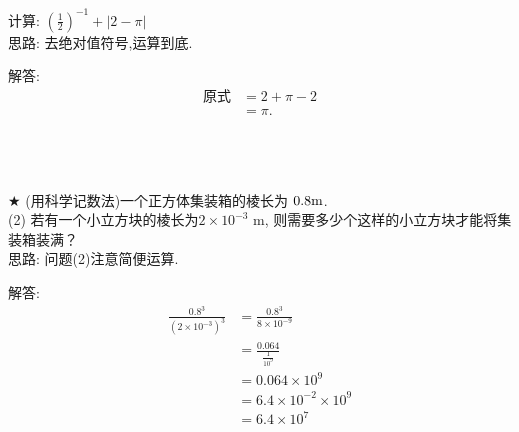 \begin{comment}
\item {
    (注意: 除号使用分数形式) 已知$10^{-m}=a, 10^{-n}=b$($m, n$是整数),求$10^{2m-3n}$的值(用含有$a, b$的代数式表示).
    \\ \\ \\
}
\end{comment}

\begin{comment}
\item {
    已知$2^x=3, 2^y=6, 2^z=12$,判断下列有关$x, y, z$的数量关系式的对错.\\
    (1) $x+z=2y$\\
    (2) $x+y+3=2z$\\
    (3) $4x=z$\\
    (4) $x+1=y$
    \\ \\
}
\end{comment}

\item {
    计算: $ (\frac{1}{2})^{-1} + \lvert 2-\pi \rvert $
    \ifshowSolution
    \fangsong{}
    \\
    思路: 去绝对值符号,运算到底.

    解答: 
    \begin{align*}
        \mbox{原式} &= 2 + \pi - 2\\
        &= \pi.
    \end{align*}
    \else
        \\ \\ \\
    \fi
}

\begin{comment}
\item {
    已知$(x+2)^{x+5}=1$, 求$x$.
    \\ \\ \\
}
\end{comment}

\item {
    $\bigstar$
    (用科学记数法)一个正方体集装箱的棱长为 $0.8 \rm{m}$.\\
    (2) 若有一个小立方块的棱长为$2\times 10^{-3} $ m, 则需要多少个这样的小立方块才能将集装箱装满？
    \ifshowSolution
    \fangsong{}
    \\
    思路: 问题(2)注意简便运算.

    解答:
    \begin{align*}
        \frac{0.8^3} {(2\times 10^{-3})^3} &= \frac{0.8^3} {8\times 10^{-9}}\\
        &= \frac{0.064} {\frac{1}{10^9}}\\
        &= 0.064\times 10^9\\
        &= 6.4\times 10^{-2}\times 10^9\\
        &= 6.4\times 10^7\\
    \end{align*}
    \else
        \\ \\ \\
    \fi
}


